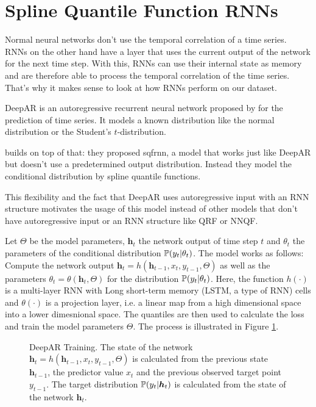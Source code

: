\section{Spline Quantile Function RNNs}
\label{sec:sqf-rnn}

Normal neural networks don't use the temporal correlation of a time series. 
RNNs on the other hand have a layer that uses the current output of the network for the 
next time step. With this, RNNs can use their internal state as memory and 
are therefore able to process the temporal correlation of the time series. 
That's why it makes sense to look at how RNNs perform on our dataset.

DeepAR is an autoregressive recurrent neural network proposed by 
\Textcite{Salinas2017} for the prediction of time series. It models 
a known distribution like the normal distribution or the Student's \(t\)-distribution. 

\Textcite{Gasthaus2019} builds on top of that: they proposed \gls{sqfrnn}, 
a model that works just like DeepAR but doesn't use a predetermined output 
distribution. Instead they model the conditional distribution 
by spline quantile functions. 

This flexibility and the fact that DeepAR uses autoregressive input with an RNN structure 
motivates the usage of this model instead of other models that don't 
have autoregressive input or an RNN structure like QRF or NNQF.

Let \(\Theta\) be the model parameters, \(\boldsymbol{h}_t\) the network output of 
time step \(t\) and \(\theta_t\) the parameters of the conditional distribution \(\P(y_t | \theta_t)\).
The model works as follows:
Compute the network output \(\boldsymbol{h}_t = h(\boldsymbol{h}_{t-1}, x_t, y_{t-1}, \Theta)\) 
as well as the parameters \(\theta_t = \theta(\boldsymbol{h}_t, \Theta)\) for the distribution
\(\P(y_t | \theta_t)\). 
Here, the function \(h(\cdot)\) is a multi-layer RNN with 
Long short-term memory (LSTM, a type of RNN) cells and \(\theta(\cdot)\) is a projection layer, 
i.e. a linear map from a high dimensional space into a lower dimesnional space. 
The quantiles are then used to calculate the loss and train the model parameters \(\Theta\).
The process is illustrated in Figure \ref{fig:deepar-training}. 

\begin{figure}[h]%
    \centering
    
    \caption[DeepAR Training]{DeepAR Training. 
    The state of the network \(\boldsymbol{h}_t = h(\boldsymbol{h}_{t-1}, x_t, y_{t-1}, \Theta)\) 
    is calculated from the previous state \(\boldsymbol{h}_{t-1}\), 
    the predictor value \(x_t\) and the previous observed target point \(y_{t-1}\). 
    The target distribution \(\P(y_t | \boldsymbol{h}_t)\) 
    is calculated from the state of the network \(\boldsymbol{h}_t\).}%
    \label{fig:deepar-training}%
\end{figure}

